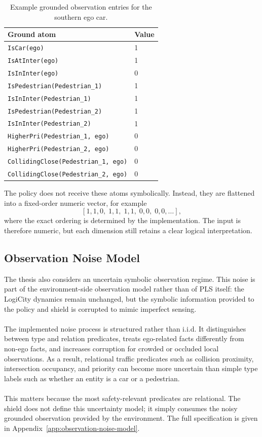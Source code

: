 \begin{table}[H]
\centering
\small
\caption{Example grounded observation entries for the southern ego car.}
\label{tab:exp1-grounded-observation-example}
\begin{tabular}{@{}ll@{}}
\toprule
\textbf{Ground atom} & \textbf{Value} \\
\midrule
\texttt{IsCar(ego)} & 1 \\
\texttt{IsAtInter(ego)} & 1 \\
\texttt{IsInInter(ego)} & 0 \\
\texttt{IsPedestrian(Pedestrian\_1)} & 1 \\
\texttt{IsInInter(Pedestrian\_1)} & 1 \\
\texttt{IsPedestrian(Pedestrian\_2)} & 1 \\
\texttt{IsInInter(Pedestrian\_2)} & 1 \\
\texttt{HigherPri(Pedestrian\_1, ego)} & 0 \\
\texttt{HigherPri(Pedestrian\_2, ego)} & 0 \\
\texttt{CollidingClose(Pedestrian\_1, ego)} & 0 \\
\texttt{CollidingClose(Pedestrian\_2, ego)} & 0 \\
\bottomrule
\end{tabular}
\end{table}

\noindent The policy does not receive these atoms symbolically. Instead, they are flattened into a fixed-order numeric vector, for example
\[
[1,1,0,\;1,1,\;1,1,\;0,0,\;0,0,\dots],
\]
\noindent where the exact ordering is determined by the implementation. The input is therefore numeric, but each dimension still retains a clear logical interpretation.

\subsection{Observation Noise Model}
The thesis also considers an uncertain symbolic observation regime. This noise is part of the environment-side observation model rather than of PLS itself: the LogiCity dynamics remain unchanged, but the symbolic information provided to the policy and shield is corrupted to mimic imperfect sensing.
\\
\\
The implemented noise process is structured rather than i.i.d. It distinguishes between type and relation predicates, treats ego-related facts differently from non-ego facts, and increases corruption for crowded or occluded local observations. As a result, relational traffic predicates such as collision proximity, intersection occupancy, and priority can become more uncertain than simple type labels such as whether an entity is a car or a pedestrian.
\\
\\
This matters because the most safety-relevant predicates are relational. The shield does not define this uncertainty model; it simply consumes the noisy grounded observation provided by the environment. The full specification is given in Appendix~\ref{app:observation-noise-model}.

